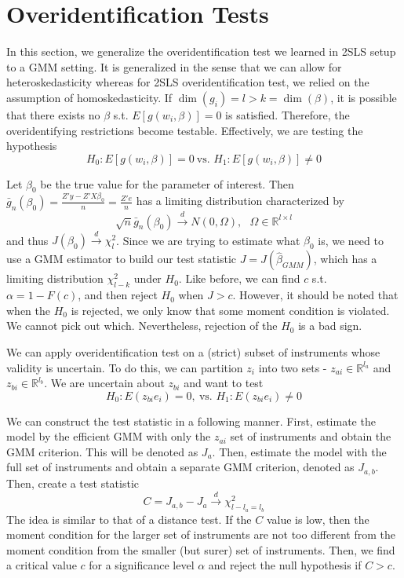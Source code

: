 \section{Overidentification Tests}
In this section, we generalize the overidentification test we learned in 2SLS setup to a GMM setting. It is generalized in the sense that we can allow for heteroskedasticity whereas for 2SLS overidentification test, we relied on the assumption of homoskedasticity. If $\dim(g_i)=l>k=\dim(\beta)$, it is possible that there exists no $\beta$ s.t. $E[g(w_i,\beta)]=0$ is satisfied. Therefore, the overidentifying restrictions become testable.  Effectively, we are testing the hypothesis
\[
H_0: E[g(w_i,\beta)]=0 \ \text{vs. } H_1: E[g(w_i,\beta)]\neq0
\]\par
Let $\beta_0$ be the true value for the parameter of interest. Then $\bar{g}_n(\beta_0)=\frac{Z'y-Z'X\beta_0}{n}=\frac{Z'e}{n}$ has a limiting distribution characterized by
\[
\sqrt{n}\bar{g}_n(\beta_0) \xrightarrow{d}N(0,\Omega),\ \ \ \Omega\in\mathbb{R}^{l\times l}
\]
and thus $J(\beta_0)\xrightarrow{d}\chi^2_l$. Since we are trying to estimate what $\beta_0$ is, we need to use a GMM estimator to build our test statistic $J=J(\hat{\beta}_{GMM})$, which has a limiting distribution $\chi^2_{l-k}$ under $H_0$. Like before, we can find $c$ s.t. $\alpha=1-F(c)$, and then reject $H_0$ when $J>c$. However, it should be noted that when the $H_0$ is rejected, we only know that some moment condition is violated. We cannot pick out which. Nevertheless, rejection of the $H_0$ is a bad sign. \par
We can apply overidentification test on a (strict) subset of instruments whose validity is uncertain. To do this, we can partition $z_i$ into two sets - $z_{ai}\in\mathbb{R}^{l_a}$ and $z_{bi}\in\mathbb{R}^{l_b}$. We are uncertain about $z_{bi}$ and want to test 
\[
H_0: E(z_{bi}e_i)=0, \ \text{vs. }H_1:E(z_{bi}e_i)\neq0
\]\par
We can construct the test statistic in a following manner. First, estimate the model by the efficient GMM with only the $z_{ai}$ set of instruments and obtain the GMM criterion. This will be denoted as $J_a$. Then, estimate the model with the full set of instruments and obtain a separate GMM criterion, denoted as $J_{a,b}$. Then, create a test statistic
\[
C=J_{a,b}-J_a\xrightarrow{d}\chi^2_{l-l_a=l_b}
\]
The idea is similar to that of a distance test. If the $C$ value is low, then the moment condition for the larger set of instruments are not too different from the moment condition from the smaller (but surer) set of instruments. Then, we find a critical value $c$ for a significance level $\alpha$ and reject the null hypothesis if $C>c$. 
